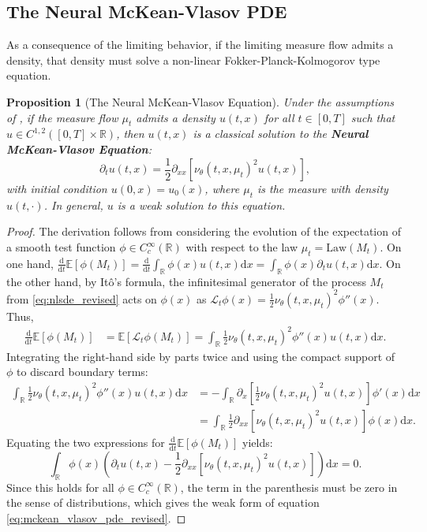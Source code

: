 \documentclass[qian]{imsart}
\newcommand{\R}{\mathbb{R}}
\newcommand{\E}{\mathbb{E}}
\newcommand{\dd}{\mathrm{d}}
\theoremstyle{plain}
\newtheorem{proposition}[theorem]{Proposition}
\theoremstyle{definition}
\begin{document}
\subsection{The Neural McKean-Vlasov PDE}

As a consequence of the limiting behavior, if the limiting measure flow admits a density, that density must solve a non-linear Fokker-Planck-Kolmogorov type equation.

\begin{proposition}[The Neural McKean-Vlasov Equation]
\label{cor:mckean_vlasov_pde}
Under the assumptions of , if the measure flow $\mu_t$ admits a density $u(t,x)$ for all $t \in [0,T]$ such that $u \in C^{1,2}([0,T]\times\R)$, then $u(t,x)$ is a classical solution to the \textbf{Neural McKean-Vlasov Equation}:
\begin{equation}
\label{eq:mckean_vlasov_pde_revised}
    \partial_t u(t,x) = \frac{1}{2} \partial_{xx} \left[ \nu_\theta(t, x, \mu_t)^2 u(t,x) \right],
\end{equation}
with initial condition $u(0,x) = u_0(x)$, where $\mu_t$ is the measure with density $u(t, \cdot)$. In general, $u$ is a weak solution to this equation.
\end{proposition}

\begin{proof}
The derivation follows from considering the evolution of the expectation of a smooth test function $\phi \in C_c^\infty(\R)$ with respect to the law $\mu_t = \mathrm{Law}(M_t)$.
On one hand, $\frac{\dd}{\dd t} \E[\phi(M_t)] = \frac{\dd}{\dd t} \int_\R \phi(x) u(t,x) \dd x = \int_\R \phi(x) \partial_t u(t,x) \dd x$.
On the other hand, by Itô's formula, the infinitesimal generator of the process $M_t$ from \eqref{eq:nlsde_revised} acts on $\phi(x)$ as $\mathcal{L}_t \phi(x) = \frac{1}{2}\nu_\theta(t,x,\mu_t)^2 \phi''(x)$. Thus,
\begin{align*}
    \frac{\dd}{\dd t} \E[\phi(M_t)] &= \E[\mathcal{L}_t \phi(M_t)] = \int_\R \frac{1}{2}\nu_\theta(t,x,\mu_t)^2 \phi''(x) u(t,x) \dd x.
\end{align*}
Integrating the right-hand side by parts twice and using the compact support of $\phi$ to discard boundary terms:
\begin{align*}
\int_\R \frac{1}{2}\nu_\theta(t,x,\mu_t)^2 \phi''(x) u(t,x) \dd x &= - \int_\R \partial_x\left[\frac{1}{2}\nu_\theta(t,x,\mu_t)^2 u(t,x)\right] \phi'(x) \dd x \\
&= \int_\R \frac{1}{2} \partial_{xx}\left[\nu_\theta(t,x,\mu_t)^2 u(t,x)\right] \phi(x) \dd x.
\end{align*}
Equating the two expressions for $\frac{\dd}{\dd t}\E[\phi(M_t)]$ yields:
\[ \int_\R \phi(x) \left( \partial_t u(t,x) - \frac{1}{2} \partial_{xx}\left[\nu_\theta(t,x,\mu_t)^2 u(t,x)\right] \right) \dd x = 0. \]
Since this holds for all $\phi \in C_c^\infty(\R)$, the term in the parenthesis must be zero in the sense of distributions, which gives the weak form of equation \eqref{eq:mckean_vlasov_pde_revised}.
\end{proof}
\end{document}
